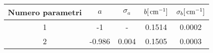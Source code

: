 \begin{tabulary}{\textwidth}{CCCCC}
\toprule
Numero parametri & $a$  & $\sigma_a$ & $b [\,\mathrm{cm}^{-1}]$ & $\sigma_b [\,\mathrm{cm}^{-1}]$\\  & -1 & - & 0.1514 & 0.0002\\
2 & -0.986 & 0.004 & 0.1505 & 0.0003\\
\bottomrule
\end{tabulary}

